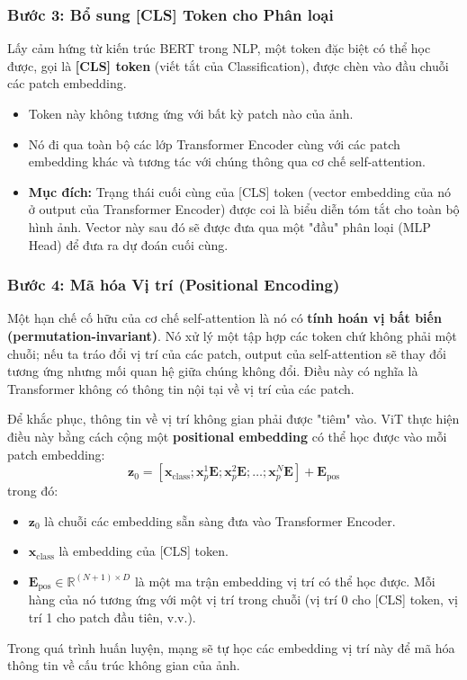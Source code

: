 \subsubsection{Bước 3: Bổ sung [CLS] Token cho Phân loại}
\label{subsubsec:vit_cls_token}
Lấy cảm hứng từ kiến trúc BERT trong NLP, một token đặc biệt có thể học được, gọi là \textbf{[CLS] token} (viết tắt của Classification), được chèn vào đầu chuỗi các patch embedding.
\begin{itemize}
	\item Token này không tương ứng với bất kỳ patch nào của ảnh.
	\item Nó đi qua toàn bộ các lớp Transformer Encoder cùng với các patch embedding khác và tương tác với chúng thông qua cơ chế self-attention.
	\item \textbf{Mục đích:} Trạng thái cuối cùng của [CLS] token (vector embedding của nó ở output của Transformer Encoder) được coi là biểu diễn tóm tắt cho toàn bộ hình ảnh. Vector này sau đó sẽ được đưa qua một "đầu" phân loại (MLP Head) để đưa ra dự đoán cuối cùng.
\end{itemize}

\subsubsection{Bước 4: Mã hóa Vị trí (Positional Encoding)}
\label{subsubsec:vit_positional_encoding}
Một hạn chế cố hữu của cơ chế self-attention là nó có \textbf{tính hoán vị bất biến (permutation-invariant)}. Nó xử lý một tập hợp các token chứ không phải một chuỗi; nếu ta tráo đổi vị trí của các patch, output của self-attention sẽ thay đổi tương ứng nhưng mối quan hệ giữa chúng không đổi. Điều này có nghĩa là Transformer không có thông tin nội tại về vị trí của các patch.

Để khắc phục, thông tin về vị trí không gian phải được "tiêm" vào. ViT thực hiện điều này bằng cách cộng một \textbf{positional embedding} có thể học được vào mỗi patch embedding:
\begin{equation}
	\mathbf{z}_0 = [\mathbf{x}_{\text{class}}; \mathbf{x}_p^1 \mathbf{E}; \mathbf{x}_p^2 \mathbf{E}; \dots ; \mathbf{x}_p^N \mathbf{E}] + \mathbf{E}_{\text{pos}}
\end{equation}
trong đó:
\begin{itemize}
	\item $\mathbf{z}_0$ là chuỗi các embedding sẵn sàng đưa vào Transformer Encoder.
	\item $\mathbf{x}_{\text{class}}$ là embedding của [CLS] token.
	\item $\mathbf{E}_{\text{pos}} \in \mathbb{R}^{(N+1) \times D}$ là một ma trận embedding vị trí có thể học được. Mỗi hàng của nó tương ứng với một vị trí trong chuỗi (vị trí 0 cho [CLS] token, vị trí 1 cho patch đầu tiên, v.v.).
\end{itemize}
Trong quá trình huấn luyện, mạng sẽ tự học các embedding vị trí này để mã hóa thông tin về cấu trúc không gian của ảnh.

